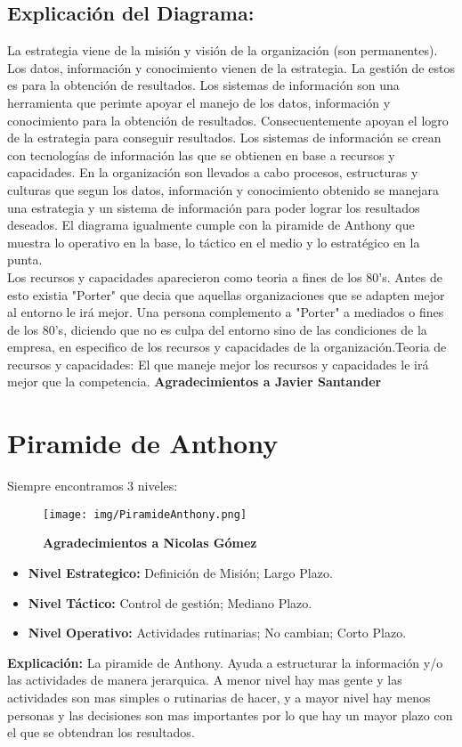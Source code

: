 \documentclass{templateNote}
\begin{document}
\newpage
\subsection*{Explicación del Diagrama:}
\indent
La estrategia viene de la misión y visión de la organización (son permanentes). Los datos, información y conocimiento vienen de la estrategia. La gestión de estos es para la obtención de resultados. Los sistemas de información son una herramienta que perimte apoyar el manejo de los datos, información y conocimiento para la obtención de resultados.
Consecuentemente apoyan el logro de la estrategia para conseguir resultados. Los sistemas de información se crean con tecnologías de información las que se obtienen en base a recursos y capacidades. En la organización son llevados a cabo procesos, estructuras y culturas que segun los datos, información y conocimiento obtenido se manejara una estrategia y un sistema de información para poder lograr los resultados deseados. El diagrama igualmente cumple con la piramide de Anthony que muestra lo operativo en la base, lo táctico en el medio y lo estratégico en la punta.
\\
Los recursos y capacidades aparecieron como teoria a fines de los 80's. Antes de esto existia "Porter" que decia que aquellas organizaciones que se adapten mejor al entorno le irá mejor. Una persona complemento a "Porter" a mediados o fines de los 80's, diciendo que no es culpa del entorno sino de las condiciones de la empresa, en especifico de los recursos y capacidades de la organización.Teoria de recursos y capacidades: El que maneje mejor los recursos y capacidades le irá mejor que la competencia.
\textbf{Agradecimientos a Javier Santander}
\newpage
\section{Piramide de Anthony}
\indent
Siempre encontramos 3 niveles:
\begin{figure}[H]
    \centering
    \texttt{[image: img/PiramideAnthony.png]}
    
    \textbf{Agradecimientos a Nicolas Gómez}
\end{figure}
\begin{itemize}
    \item \textbf{Nivel Estrategico:} Definición de Misión; Largo Plazo.
    \item \textbf{Nivel Táctico:} Control de gestión; Mediano Plazo.
    \item \textbf{Nivel Operativo:} Actividades rutinarias; No cambian; Corto Plazo.
\end{itemize}
\textbf{Explicación:} La piramide de Anthony. Ayuda a estructurar la información y/o las actividades de manera jerarquica. A menor nivel hay mas gente y las actividades son mas simples o rutinarias de hacer, y a mayor nivel hay menos personas y las decisiones son mas importantes por lo que hay un mayor plazo con el que se obtendran los resultados.
\end{document}
